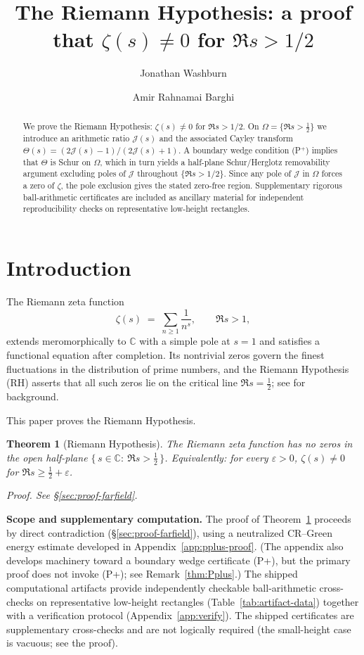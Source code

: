 \documentclass[11pt]{amsart}
\title[The Riemann Hypothesis]{The Riemann Hypothesis: a proof that $\zeta(s)\neq 0$ for $\Re s>1/2$}
\author{Jonathan Washburn}\thanks{Recognition Physics Research Institute, Austin, TX, USA; \email{jon@recognitionphysics.org}.}
\author{Amir Rahnamai Barghi}\thanks{Correspondence: \texttt{arahnama@gmail.com}.}\thanks{Recognition Physics Research Institute, Austin, TX, USA; \email{arahnamab@gmail.com}.}\thanks{Correspondence: arahnamab@gmail.com}
\date{}
\newtheorem{theorem}{Theorem}
\theoremstyle{definition}
\theoremstyle{remark}
\newcommand{\C}{\mathbb{C}}
\begin{document}
\begin{abstract}
We prove the Riemann Hypothesis: $\zeta(s)\neq 0$ for $\Re s>1/2$.
On $\Omega=\{\Re s>\tfrac12\}$ we introduce an arithmetic ratio $\mathcal J(s)$ and the associated Cayley transform
$\Theta(s)=(2\mathcal J(s)-1)/(2\mathcal J(s)+1)$.
A boundary wedge condition (P$^+$) implies that $\Theta$ is Schur on $\Omega$, which in turn yields a half-plane Schur/Herglotz removability argument
excluding poles of $\mathcal J$ throughout $\{\Re s>1/2\}$.
Since any pole of $\mathcal J$ in $\Omega$ forces a zero of $\zeta$, the pole exclusion gives the stated zero-free region.
Supplementary rigorous ball-arithmetic certificates are included as ancillary material for independent reproducibility checks on representative low-height rectangles.
\end{abstract}

\maketitle

\section{Introduction}

The Riemann zeta function
\[
  \zeta(s)\;=\;\sum_{n\ge 1}\frac{1}{n^s},\qquad \Re s>1,
\]
extends meromorphically to $\C$ with a simple pole at $s=1$ and satisfies a functional equation after completion.
Its nontrivial zeros govern the finest fluctuations in the distribution of prime numbers, and the Riemann Hypothesis (RH) asserts that all such zeros lie on the critical line $\Re s=\tfrac12$; see \cite{Titchmarsh,IK} for background.

This paper proves the Riemann Hypothesis.
\begin{theorem}[Riemann Hypothesis]\label{thm:farfield}
The Riemann zeta function has no zeros in the open half-plane $\{\,s\in\C:\ \Re s> \tfrac12\,\}$.
Equivalently: for every $\varepsilon>0$, $\zeta(s)\neq 0$ for $\Re s\ge \tfrac12+\varepsilon$.

\noindent\textit{Proof.} See \S\ref{sec:proof-farfield}.
\end{theorem}

\noindent\textbf{Scope and supplementary computation.}
The proof of Theorem~\ref{thm:farfield} proceeds by direct contradiction (\S\ref{sec:proof-farfield}),
using a neutralized CR--Green energy estimate developed in Appendix~\ref{app:pplus-proof}.
(The appendix also develops machinery toward a boundary wedge certificate \textup{(P+)},
but the primary proof does not invoke \textup{(P+)}; see Remark~\ref{thm:Pplus}.)
The shipped computational artifacts provide independently checkable ball-arithmetic cross-checks on representative low-height rectangles (Table~\ref{tab:artifact-data}) together with a verification protocol (Appendix~\ref{app:verify}).
The shipped certificates are supplementary cross-checks and are
not logically required (the small-height case is vacuous; see the proof).
\end{document}
